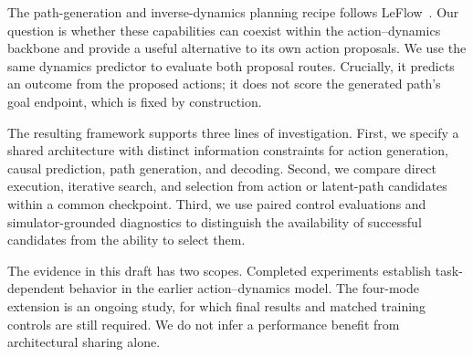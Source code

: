 The path-generation and inverse-dynamics planning recipe follows LeFlow~\cite{huang2026leflow}. Our question is whether these capabilities can coexist within the action--dynamics backbone and provide a useful alternative to its own action proposals. We use the same dynamics predictor to evaluate both proposal routes. Crucially, it predicts an outcome from the proposed actions; it does not score the generated path's goal endpoint, which is fixed by construction.

The resulting framework supports three lines of investigation. First, we specify a shared architecture with distinct information constraints for action generation, causal prediction, path generation, and decoding. Second, we compare direct execution, iterative search, and selection from action or latent-path candidates within a common checkpoint. Third, we use paired control evaluations and simulator-grounded diagnostics to distinguish the availability of successful candidates from the ability to select them.

The evidence in this draft has two scopes. Completed experiments establish task-dependent behavior in the earlier action--dynamics model. The four-mode extension is an ongoing study, for which final results and matched training controls are still required. We do not infer a performance benefit from architectural sharing alone.
